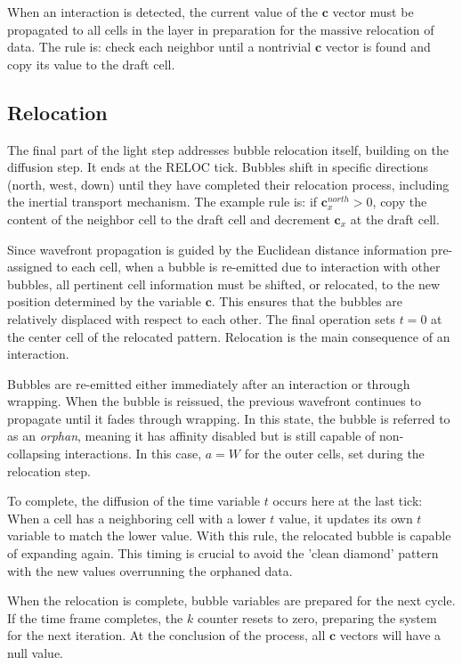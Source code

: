 \documentclass[12pt,english]{article}
\begin{document}
When an interaction is detected, the current value of the \(\mathbf{c}\) vector must be propagated to all cells in the layer in preparation for the massive relocation of data. The rule is: check each neighbor until a nontrivial \(\mathbf{c}\) vector is found and copy its value to the draft cell.

\subsection{Relocation} \label{subsec:relocation}
The final part of the light step addresses bubble relocation itself, building on the diffusion step. It ends at the RELOC tick. Bubbles shift in specific directions (north, west, down) until they have completed their relocation process, including the inertial transport mechanism. The example rule is: if $\textbf{c}_x^{north}>0$, copy the content of the neighbor cell to the draft cell and decrement $\textbf{c}_x$ at the draft cell.

Since wavefront propagation is guided by the Euclidean distance information pre-assigned to each cell, when a bubble is re-emitted due to interaction with other bubbles, all pertinent cell information must be shifted, or relocated, to the new position determined by the variable $\textbf{c}$. This ensures that the bubbles are relatively displaced with respect to each other. The final operation sets $t=0$ at the center cell of the relocated pattern. Relocation is the main consequence of an interaction.

Bubbles are re-emitted either immediately after an interaction or through wrapping. When the bubble is reissued, the previous wavefront continues to propagate until it fades through wrapping. In this state, the bubble is referred to as an \textit{orphan}, meaning it has affinity disabled but is still capable of non-collapsing interactions. In this case, $a=W$ for the outer cells, set during the relocation step. 

To complete, the diffusion of the time variable $t$ occurs here at the last tick: When a cell has a neighboring cell with a lower $t$ value, it updates its own $t$ variable to match the lower value. With this rule, the relocated bubble is capable of expanding again. This timing is crucial to avoid the 'clean diamond' pattern with the new values overrunning the orphaned data.

When the relocation is complete, bubble variables are prepared for the next cycle. If the time frame completes, the $k$ counter resets to zero, preparing the system for the next iteration.  At the conclusion of the process, all $\boldsymbol{c}$ vectors will have a null value.
\end{document}
